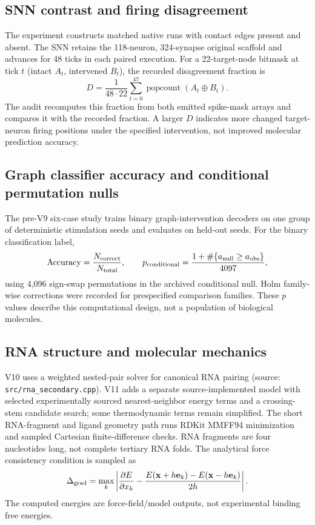 \documentclass[11pt,a4paper]{article}
\begin{document}
\subsection{SNN contrast and firing disagreement}
The experiment constructs matched native runs with contact edges present and absent. The SNN retains the 118-neuron, 324-synapse original scaffold and advances for 48 ticks in each paired execution. For a 22-target-node bitmask at tick $t$ (intact $A_t$, intervened $B_t$), the recorded disagreement fraction is
\begin{equation}
D=\frac{1}{48\cdot22}\sum_{t=0}^{47}\operatorname{popcount}(A_t\oplus B_t).
\end{equation}
The audit recomputes this fraction from both emitted spike-mask arrays and compares it with the recorded fraction. A larger $D$ indicates more changed target-neuron firing positions under the specified intervention, not improved molecular prediction accuracy.

\subsection{Graph classifier accuracy and conditional permutation nulls}
The pre-V9 six-case study trains binary graph-intervention decoders on one group of deterministic stimulation seeds and evaluates on held-out seeds. For the binary classification label,
\begin{equation}
\mathrm{Accuracy}=\frac{N_{\rm correct}}{N_{\rm total}},\qquad
p_{\rm conditional}=\frac{1+\#\{a_{\rm null}\ge a_{\rm obs}\}}{4097},
\end{equation}
using 4,096 sign-swap permutations in the archived conditional null. Holm family-wise corrections were recorded for prespecified comparison families. These $p$ values describe this computational design, not a population of biological molecules.

\subsection{RNA structure and molecular mechanics}
V10 uses a weighted nested-pair solver for canonical RNA pairing (source: \texttt{src/rna\_secondary.cpp}). V11 adds a separate source-implemented model with selected experimentally sourced nearest-neighbor energy terms and a crossing-stem candidate search; some thermodynamic terms remain simplified. The short RNA-fragment and ligand geometry path runs RDKit MMFF94 minimization and sampled Cartesian finite-difference checks. RNA fragments are four nucleotides long, not complete tertiary RNA folds. The analytical force consistency condition is sampled as
\begin{equation}
\Delta_{\rm grad}=\max_k\left|\frac{\partial E}{\partial x_k} - \frac{E(\mathbf x+h\mathbf e_k)-E(\mathbf x-h\mathbf e_k)}{2h}\right|.
\end{equation}
The computed energies are force-field/model outputs, not experimental binding free energies.
\end{document}
